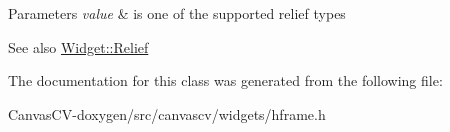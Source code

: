 \begin{DoxyParams}{Parameters}
{\em value} & is one of the supported relief types \\
\hline
\end{DoxyParams}
\begin{DoxySeeAlso}{See also}
\hyperlink{classcanvascv_1_1Widget_a8253daa509c55c24c92ce0d3dd93e4cd}{Widget\+::\+Relief} 
\end{DoxySeeAlso}


The documentation for this class was generated from the following file\+:\begin{DoxyCompactItemize}
\item 
Canvas\+C\+V-\/doxygen/src/canvascv/widgets/hframe.\+h\end{DoxyCompactItemize}
